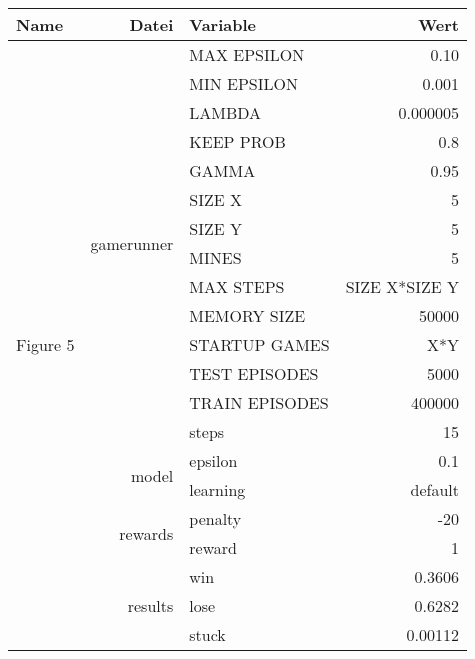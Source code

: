 \documentclass{article}
\begin{document}
\begin{tabularx}{\textwidth}{l|r|X|r}
	Name & Datei & Variable & Wert \\
	\hline
	\multirow{21}{*}{Figure 5} & \multirow{14}{*}{gamerunner} & MAX EPSILON	& 0.10\\
	& & MIN EPSILON	& 0.001 \\
	& & LAMBDA & 0.000005 \\
	& & KEEP PROB & 0.8 \\
	& & GAMMA	& 0.95 \\
	& & SIZE X & 5 \\
	& & SIZE Y & 5 \\
	& & MINES & 5 \\
	& & MAX STEPS & SIZE X*SIZE Y\\
	& & MEMORY SIZE & 50000 \\
	& & STARTUP GAMES & X*Y \\
	& & TEST EPISODES & 5000 \\
	& & TRAIN EPISODES & 400000 \\
	& & steps & 15\\\cline{2-4}
	& \multirow{2}{*}{model} & epsilon & 0.1\\
	& & learning & default \\\cline{2-4}
	& \multirow{2}{*}{rewards} & penalty & -20\\
	& & reward & 1\\\cline{2-4}
	& \multirow{3}{*}{results} & win & 0.3606\\
	& & lose & 0.6282\\
	& & stuck & 0.00112\\
	\hline
\end{tabularx}
\end{document}
